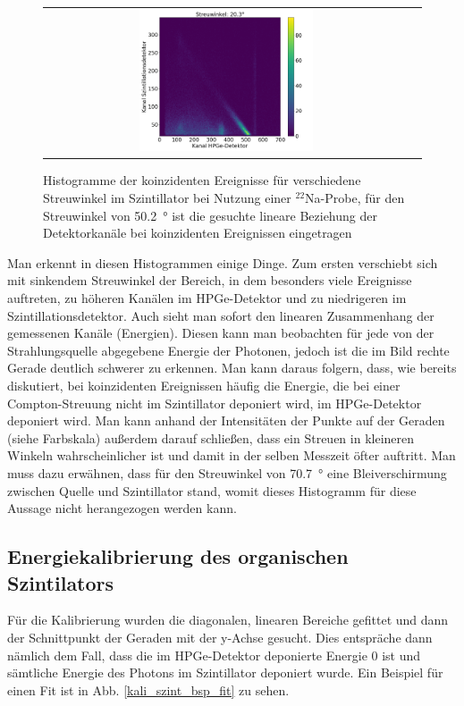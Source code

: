 \begin{figure}[ht]
\begin{tabular}{c c}
        \includegraphics[width=0.49\textwidth]{images/kali_szint_Streuwinkel_20_v2.png} & \\
    \end{tabular}
	\caption{Histogramme der koinzidenten Ereignisse für verschiedene Streuwinkel im Szintillator bei Nutzung einer $^{22}$Na-Probe, für den Streuwinkel von \SI{50.2}{\degree} ist die gesuchte lineare Beziehung der Detektorkanäle bei koinzidenten Ereignissen eingetragen}
	\label{kali_szint_winkelabh}
\end{figure}

Man erkennt in diesen Histogrammen einige Dinge. Zum ersten verschiebt sich mit sinkendem Streuwinkel der Bereich, in dem besonders viele Ereignisse auftreten, zu höheren Kanälen im HPGe-Detektor und zu niedrigeren im Szintillationsdetektor. Auch sieht man sofort den linearen Zusammenhang der gemessenen Kanäle (Energien). Diesen kann man beobachten für jede von der Strahlungsquelle abgegebene Energie der Photonen, jedoch ist die im Bild rechte Gerade deutlich schwerer zu erkennen. Man kann daraus folgern, dass, wie bereits diskutiert, bei koinzidenten Ereignissen häufig die Energie, die bei einer Compton-Streuung nicht im Szintillator deponiert wird, im HPGe-Detektor deponiert wird. Man kann anhand der Intensitäten der Punkte auf der Geraden (siehe Farbskala) außerdem darauf schließen, dass ein Streuen in kleineren Winkeln wahrscheinlicher ist und damit in der selben Messzeit öfter auftritt. Man muss dazu erwähnen, dass für den Streuwinkel von \SI{70.7}{\degree} eine Bleiverschirmung zwischen Quelle und Szintillator stand, womit dieses Histogramm für diese Aussage nicht herangezogen werden kann.

\subsection{Energiekalibrierung des organischen Szintilators}

Für die Kalibrierung wurden die diagonalen, linearen Bereiche gefittet und dann der Schnittpunkt der Geraden mit der y-Achse gesucht. Dies entspräche dann nämlich dem Fall, dass die im HPGe-Detektor deponierte Energie $0$ ist und sämtliche Energie des Photons im Szintillator deponiert wurde. Ein Beispiel für einen Fit ist in Abb. \ref{kali_szint_bsp_fit} zu sehen.

